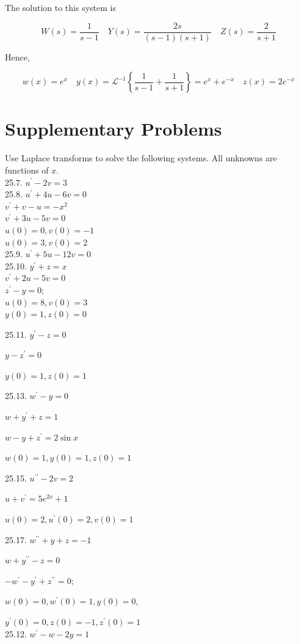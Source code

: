 \documentclass[10pt]{article}
\begin{document}
The solution to this system is

$$
W(s)=\frac{1}{s-1} \quad Y(s)=\frac{2 s}{(s-1)(s+1)} \quad Z(s)=\frac{2}{s+1}
$$

Hence,

$$
w(x)=e^{x} \quad y(x)=\mathscr{L}^{-1}\left\{\frac{1}{s-1}+\frac{1}{s+1}\right\}=e^{x}+e^{-x} \quad z(x)=2 e^{-x}
$$

\section*{Supplementary Problems}
Use Laplace transforms to solve the following systems. All unknowns are functions of $x$.\\
25.7. $u^{\prime}-2 v=3$\\
25.8. $u^{\prime}+4 u-6 v=0$\\
$v^{\prime}+v-u=-x^{2}$\\
$v^{\prime}+3 u-5 v=0$\\
$u(0)=0, v(0)=-1$\\
$u(0)=3, v(0)=2$\\
25.9. $u^{\prime}+5 u-12 v=0$\\
25.10. $y^{\prime}+z=x$\\
$v^{\prime}+2 u-5 v=0$\\
$z^{\prime}-y=0 ;$\\
$u(0)=8, v(0)=3$\\
$y(0)=1, z(0)=0$

25.11. $y^{\prime}-z=0$

$y-z^{\prime}=0$

$y(0)=1, z(0)=1$

25.13. $w^{\prime}-y=0$

$w+y^{\prime}+z=1$

$w-y+z^{\prime}=2 \sin x$

$w(0)=1, y(0)=1, z(0)=1$

25.15. $u^{\prime \prime}-2 v=2$

$u+v^{\prime}=5 e^{2 x}+1$

$u(0)=2, u^{\prime}(0)=2, v(0)=1$

25.17. $w^{\prime \prime}+y+z=-1$

$w+y^{\prime \prime}-z=0$

$-w^{\prime}-y^{\prime}+z^{\prime \prime}=0$;

$w(0)=0, w^{\prime}(0)=1, y(0)=0$,

$y^{\prime}(0)=0, z(0)=-1, z^{\prime}(0)=1$\\
25.12. $w^{\prime}-w-2 y=1$
\end{document}
